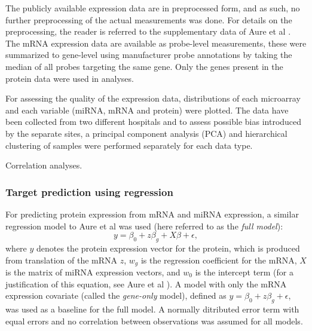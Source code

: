 The publicly available expression data are in preprocessed form, and as such,
no further preprocessing of the actual measurements was done. For details on
the preprocessing, the reader is referred to the supplementary data of Aure et
al \citep{Aure2015}. The mRNA expression data are available as probe-level
measurements, these were summarized to gene-level using manufacturer probe
annotations by taking the median of all probes targeting the same gene.
Only the genes present in the protein data were used in analyses.

For assessing the quality of the expression data, distributions of each
microarray and each variable (miRNA, mRNA and protein) were plotted. The data
have been collected from two different hospitals and to assess possible bias
introduced by the separate sites, a principal component analysis (PCA) and
hierarchical clustering of samples were performed separately for each data
type.



Correlation analyses.


\subsubsection{Target prediction using regression}\label{sec:PPVS}

For predicting protein expression from mRNA and miRNA expression, a similar
regression model to Aure et al was used (here referred to as the \emph{full
model}):
\begin{equation}
	y = \beta_0 + z \beta_g + X \beta + \epsilon,
\end{equation}
where $y$ denotes the protein expression vector for the protein, which
is produced from translation of the mRNA $z$, $w_g$
is the regression coefficient for the mRNA, $X$ is the matrix of miRNA
expression vectors, and $w_0$ is the intercept term
(for a justification of this equation, see Aure et al \citep{Aure2015}).
A model with only the mRNA expression covariate (called the \emph{gene-only} model),
defined as $y = \beta_0 + z \beta_g + \epsilon$, was used as a baseline for the full model.
A normally ditributed error term with equal errors and no correlation
between observations was assumed for all models.

